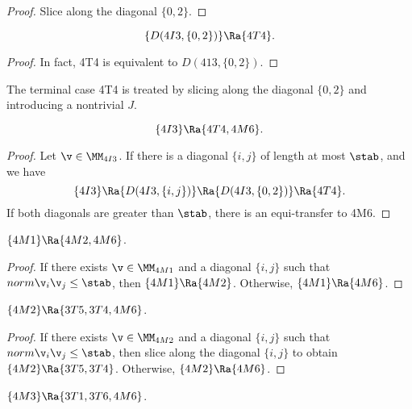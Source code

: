 \begin{proof}
Slice along the diagonal $\{0,2\}$.
\end{proof}

\begin{lemma}[]
\[
\{D(4I3,\{0,2\})\}\Ra \{4T4\}.
\]
\end{lemma}

\begin{proof}
In fact,  4T4 is equivalent to $D(413,\{0,2\})$.
\end{proof}

\begin{remark}  The terminal case 4T4 is treated by slicing along the diagonal $\{0,2\}$ and introducing
a nontrivial $J$.
\end{remark}

\begin{lemma}[]
\[
\{4I3\}\Ra\{4T4,4M6\}.
\]
\end{lemma}

\begin{proof}
Let $\v\in \MM_{4I3}$.  
If there is a diagonal $\{i,j\}$ of length at most $\stab$, and we have
\[
\{4I3\}\Ra\{D(4I3,\{i,j\})\}\Ra \{D(4I3,\{0,2\})\} \Ra\{4T4\}.
\]
If both diagonals are greater than $\stab$, there is an equi-transfer to 4M6.
\end{proof}

\begin{lemma}[]
$\{4M1\}\Ra\{4M2,4M6\}$.
\end{lemma}

\begin{proof} 
If there exists $\v\in \MM_{4M1}$ and a diagonal $\{i,j\}$ such that $norm{\v_i}{\v_j}\le \stab$,
then $\{4M1\}\Ra\{4M2\}$.  Otherwise, $\{4M1\}\Ra\{4M6\}$.
\end{proof}

\begin{lemma}[]
$\{4M2\}\Ra\{3T5,3T4,4M6\}$.
\end{lemma}

\begin{proof}
If there exists $\v\in \MM_{4M2}$ and a diagonal $\{i,j\}$ such that $norm{\v_i}{\v_j}\le \stab$,
then slice along the diagonal $\{i,j\}$ to obtain $\{4M2\}\Ra \{3T5,3T4\}$.
Otherwise, $\{4M2\}\Ra\{4M6\}$.
\end{proof}

\begin{lemma}[]
$\{4M3\}\Ra\{3T1,3T6,4M6\}$.
\end{lemma}

